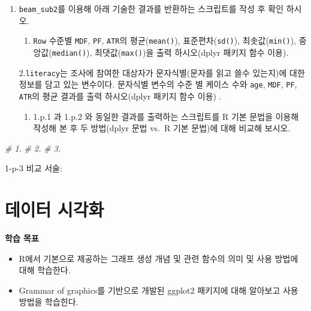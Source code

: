 \documentclass[
  11pt,
]{krantz}
\makeatletter
\newenvironment{Shaded}{\begin{snugshade}}{\end{snugshade}}
\newcommand{\CommentTok}[1]{\textcolor[rgb]{0.37,0.37,0.37}{\textit{#1}}}
\providecommand{\tightlist}{%
  \setlength{\itemsep}{0pt}\setlength{\parskip}{0pt}}
\newenvironment{kframe}{%
\medskip{}
\setlength{\fboxsep}{.8em}
 \def\at@end@of@kframe{}%
 \ifinner\ifhmode%
  \def\at@end@of@kframe{\end{minipage}}%
  \begin{minipage}{\columnwidth}%
 \fi\fi%
 \def\FrameCommand##1{\hskip\@totalleftmargin \hskip-\fboxsep
 \colorbox{shadecolor}{##1}\hskip-\fboxsep
     \hskip-\linewidth \hskip-\@totalleftmargin \hskip\columnwidth}%
 \MakeFramed {\advance\hsize-\width
   \@totalleftmargin\z@ \linewidth\hsize
   \@setminipage}}%
 {\par\unskip\endMakeFramed%
 \at@end@of@kframe}
\newenvironment{rmdblock}[1]
  {
  \begin{itemize}
  \renewcommand{\labelitemi}{
    \raisebox{-.7\height}[0pt][0pt]{
      {\setkeys{Gin}{width=3em,keepaspectratio}\texttt{[image: images/\#1]}}
    }
  }
  \setlength{\fboxsep}{1em}
  \begin{kframe}
  \item
  }
  {
  \end{kframe}
  \end{itemize}
  }
\newenvironment{rmdimportant}
  {\begin{rmdblock}{important}}
  {\end{rmdblock}}
\renewenvironment{quote}{\begin{kframe}}{\end{kframe}}
\makeatother
\begin{document}
\begin{enumerate}
\def\labelenumi{\alph{enumi}.}
\setcounter{enumi}{15}
\item
  \texttt{beam\_sub2}를 이용해 아래 기술한 결과를 반환하는 스크립트를 작성 후 확인 하시오.

  \begin{enumerate}
  \def\labelenumii{\arabic{enumii}.}
  \tightlist
  \item
    \texttt{Row} 수준별 \texttt{MDF}, \texttt{PF}, \texttt{ATR}의 평균(\texttt{mean()}), 표준편차(\texttt{sd()}), 최솟값(\texttt{min()}), 중앙값(\texttt{median()}), 최댓값(\texttt{max()})을 출력 하시오(dplyr 패키지 함수 이용).
  \end{enumerate}

  2.\texttt{literacy}는 조사에 참여한 대상자가 문자식별(문자를 읽고 쓸수 있는지)에 대한 정보를 담고 있는 변수이다. 문자식별 변수의 수준 별 케이스 수와 \texttt{age}, \texttt{MDF}, \texttt{PF}, \texttt{ATR}의 평균 결과를 출력 하시오(dplyr 패키지 함수 이용) .

  \begin{enumerate}
  \def\labelenumii{\arabic{enumii}.}
  \setcounter{enumii}{2}
  \tightlist
  \item
    1.p.1 과 1.p.2 와 동일한 결과를 출력하는 스크립트를 R 기본 문법을 이용해 작성해 본 후 두 방법(dplyr 문법 vs.~R 기본 문법)에 대해 비교해 보시오.
  \end{enumerate}
\end{enumerate}

\footnotesize

\begin{Shaded}
\begin{Highlighting}[]
\CommentTok{# 1.}
\CommentTok{# 2.}
\CommentTok{# 3.}
\end{Highlighting}
\end{Shaded}

\normalsize

\begin{quote}
1-p-3 비교 서술:
\end{quote}

\hypertarget{ch-data-visualization}{%
\chapter{데이터 시각화}\label{ch-data-visualization}}

\footnotesize

\begin{rmdimportant}
\begin{rmdimportant}

\textbf{학습 목표}

\begin{itemize}
\tightlist
\item
  R에서 기본으로 제공하는 그래프 생성 개념 및 관련 함수의 의미 및 사용 방법에 대해 학습한다.
\item
  Grammar of graphics를 기반으로 개발된 ggplot2 패키지에 대해 알아보고 사용 방법을 학습힌다.
\end{itemize}

\end{rmdimportant}
\end{rmdimportant}
\end{document}
